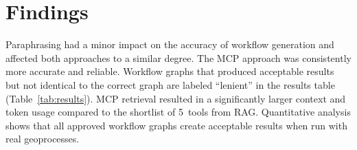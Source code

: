 \section{Findings}
\label{sec:findings}

Paraphrasing had a minor impact on the accuracy of workflow generation and affected both
approaches to a similar degree. The MCP approach was consistently more accurate and reliable.
Workflow graphs that produced acceptable results but not identical to the correct graph are
labeled ``lenient'' in the results table (Table~\ref{tab:results}). MCP retrieval resulted in a
significantly larger context and token usage compared to the shortlist of 5~tools from RAG.
Quantitative analysis shows that all approved workflow graphs create acceptable results when run
with real geoprocesses.



